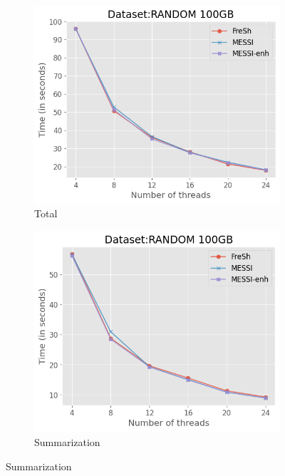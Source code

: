 \begin{figure}[htbp]
    \centering
    \begin{subfigure}{0.45\textwidth}
        \includegraphics[width=\textwidth]{figures/Experiments/fresh-messi-threads-random-total}
        \caption{Total}
        \label{fig:eval:fresh-messi-threads:random:total-from-4}
    \end{subfigure}    
    \begin{subfigure}{0.45\textwidth}
        \includegraphics[width=\textwidth]{figures/Experiments/fresh-messi-threads-random-summarization}
        \caption{Summarization}
        \label{fig:eval:fresh-messi-threads:random:recbuf-from-4}
    \end{subfigure}    


\end{figure}
